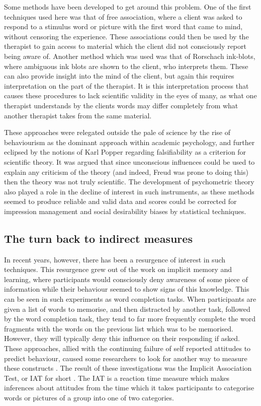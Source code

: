 Some methods have been developed to get around this problem. One of the first techniques used here was that of free association, where a client was asked to respond to a stimulus word or picture with the first word that came to mind, without censoring the experience. These associations could then be used by the therapist to gain access to material which the client did not consciously report being aware of. Another method which was used was that of Rorschach ink-blots, where ambiguous ink blots are shown to the client, who interprets them. These can also provide insight into the mind of the client, but again this requires interpretation on the part of the therapist. It is this interpretation process that causes these procedures to lack scientific validity in the eyes of many, as what one therapist understands by the clients words may differ completely from what another therapist takes from the same material. 

These approaches were relegated outside the pale of science by the rise of behaviourism as the dominant approach within academic psychology, and further eclipsed by the notions of Karl Popper regarding falsifiability as a criterion for scientific theory. It was argued that since unconscious influences could be used to explain any criticism of the theory (and indeed, Freud was prone to doing this) then the theory was not truly scientific. The development of psychometric theory also played a role in the decline of interest in such instruments, as these methods seemed to produce reliable and valid data and scores could be corrected for impression management and social desirability biases by statistical techniques. 

\subsection{The turn back to indirect measures}

In recent years, however, there has been a resurgence of interest in such techniques. This resurgence grew out of the work on implicit memory and learning, where participants would consciously deny awareness of some piece of information while their behaviour seemed to show signs of this knowledge. This can be seen in such experiments as word completion tasks. When participants are given a list of words to memorise, and then distracted by another task, followed by the word completion task, they tend to far more frequently complete the word fragments with the words on the previous list which was to be memorised. However, they will typically deny this influence on their responding if asked. These approaches, allied with the continuing failure of self reported attitudes to predict behaviour, caused some researchers to look for another way to measure these constructs \cite{Greenwald1995a}. The result of these investigations was the Implicit Association Test, or IAT for short \cite{Greenwald1998}. The IAT is a reaction time measure which makes inferences about attitudes from the time which it takes participants to categorise words or pictures of a group into one of two categories. 


